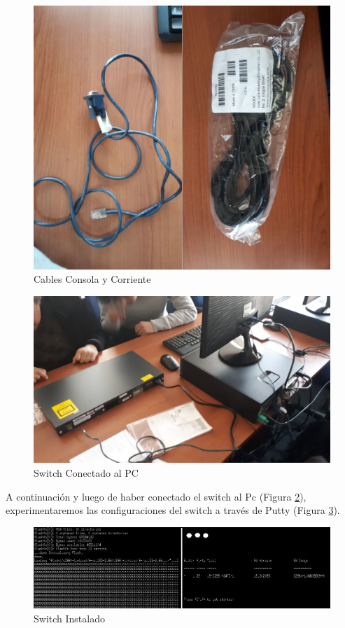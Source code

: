 \documentclass{article}
\begin{document}
\begin{figure}[h!]
\centering
\includegraphics[scale=0.1]{Cables.jpg}
\caption{Cables Consola y Corriente}
\label{fig:cabl}
\end{figure}

\newpage

\begin{figure}[h!]
\centering
\includegraphics[scale=0.1]{SwitchConectado.jpg}
\caption{Switch Conectado al PC}
\label{fig:conec}
\end{figure}

A continuación y luego de haber conectado el switch al Pc (Figura \ref{fig:conec}), experimentaremos las configuraciones del switch a través de Putty (Figura \ref{fig:inst}).

\begin{figure}[h!]
\centering
\includegraphics[scale=0.5]{2.png}
\caption{Switch Instalado}
\label{fig:inst}
\end{figure}
\end{document}
